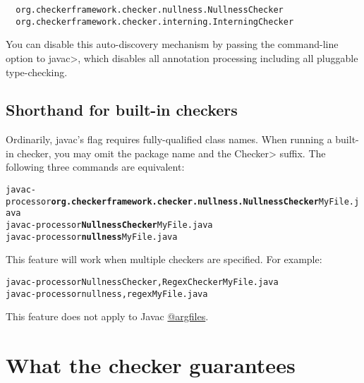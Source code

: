 \begin{smaller}
\begin{Verbatim}
  org.checkerframework.checker.nullness.NullnessChecker
  org.checkerframework.checker.interning.InterningChecker
\end{Verbatim}
\end{smaller}

You can disable this auto-discovery mechanism by passing the
 command-line option to \<javac>, which disables all
annotation processing including all pluggable type-checking.


\subsection{Shorthand for built-in checkers \label{shorthand-for-checkers}}


Ordinarily, javac's  flag requires fully-qualified class names.
When running a built-in checker, you may
omit the package name and the \<Checker> suffix.
The following three commands are equivalent:

\begin{alltt}
  javac -processor \textbf{org.checkerframework.checker.nullness.NullnessChecker} MyFile.java
  javac -processor \textbf{NullnessChecker} MyFile.java
  javac -processor \textbf{nullness} MyFile.java
\end{alltt}

This feature will work when multiple checkers are specified.
For example:

\begin{alltt}
  javac -processor NullnessChecker,RegexChecker MyFile.java
  javac -processor nullness,regex MyFile.java
\end{alltt}

This feature does not apply to Javac \href{https://docs.oracle.com/javase/8/docs/technotes/tools/windows/javac.html#BHCJEIBB}{@argfiles}.


\section{What the checker guarantees\label{checker-guarantees}}

